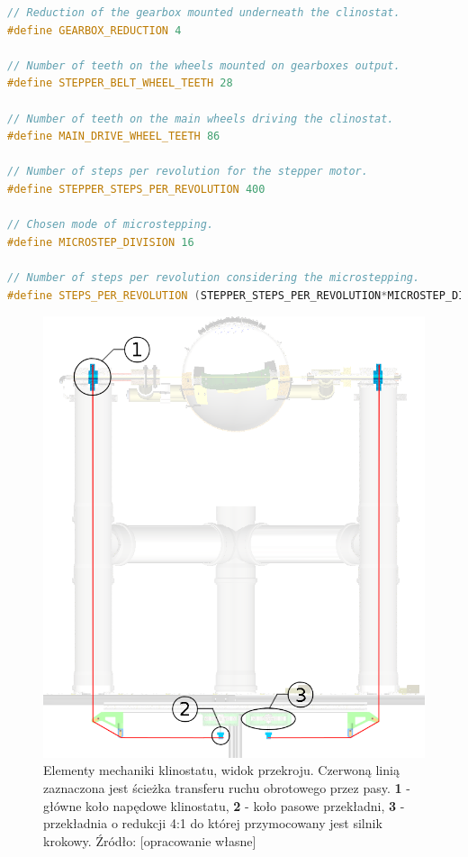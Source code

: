 \begin{lstlisting}[language=C++, caption=clinostat\_mechanics.hpp]
// Reduction of the gearbox mounted underneath the clinostat.
#define GEARBOX_REDUCTION 4 

// Number of teeth on the wheels mounted on gearboxes output.
#define STEPPER_BELT_WHEEL_TEETH 28 

// Number of teeth on the main wheels driving the clinostat.
#define MAIN_DRIVE_WHEEL_TEETH 86 

// Number of steps per revolution for the stepper motor.
#define STEPPER_STEPS_PER_REVOLUTION 400 

// Chosen mode of microstepping.
#define MICROSTEP_DIVISION 16 

// Number of steps per revolution considering the microstepping.
#define STEPS_PER_REVOLUTION (STEPPER_STEPS_PER_REVOLUTION*MICROSTEP_DIVISION)
\end{lstlisting}

\begin{figure}[h]
	
	\centering
	\includegraphics[scale=0.3]{klinostat_przekroj}
	\caption{Elementy mechaniki klinostatu, widok przekroju. Czerwoną linią zaznaczona jest ścieżka transferu ruchu obrotowego przez pasy. \textbf{1} - główne koło napędowe klinostatu, \textbf{2} - koło pasowe przekładni, \textbf{3} - przekładnia o redukcji 4:1 do której przymocowany jest silnik krokowy. Źródło: [opracowanie własne]} 
	\label{fig:klinostat_mechanika}
\end{figure}

